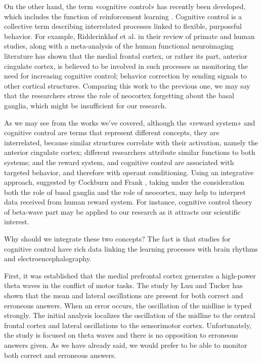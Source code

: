 \documentclass[14pt,a4paper]{scrartcl}
\begin{document}
On the other hand, the term «cognitive control» has recently been developed, which includes the function of reinforcement learning \cite{Cockburn2011}. Cognitive control is a collective term describing interrelated processes linked to flexible, purposeful behavior. For example, Ridderinkhof et al. \cite{Ridderinkhof2004} in their review of primate and human studies, along with a meta-analysis of the human functional neuroimaging literature has shown that the medial frontal cortex, or rather its part, anterior cingulate cortex, is believed to be involved in such processes as monitoring the need for increasing cognitive control; behavior correction by sending signals to other cortical structures. Comparing this work to the previous one, we may say that the researchers stress the role of neocortex forgetting about the basal ganglia, which might be insufficient for our research.

As we may see from the works we’ve covered, although the «reward system» and cognitive control are terms that represent different concepts, they are interrelated, because similar structures correlate with their activation, namely the anterior cingulate cortex; different researchers attribute similar functions to both systems; and the reward system, and cognitive control are associated with targeted behavior, and therefore with operant conditioning. Using an integrative approach, suggested by Cockburn and Frank \cite{Cockburn2011}, taking under the consideration both the role of basal ganglia and the role of neocortex, may help to interpret data received from human reward system. For instance, cognitive control theory of beta-wave part may be applied to our research as it attracts our scientific interest.

Why should we integrate these two concepts? The fact is that studies for cognitive control have rich data linking the learning processes with brain rhythms and electroencephalography.

First, it was established that the medial prefrontal cortex generates a high-power theta waves in the conflict of motor tasks. The study by Luu and Tucker \cite{Luu2001} has shown that the mean and lateral oscillations are present for both correct and erroneous answers. When an error occurs, the oscillation of the midline is typed strongly. The initial analysis localizes the oscillation of the midline to the central frontal cortex and lateral oscillations to the sensorimotor cortex. Unfortunately, the study is focused on theta waves and there is no opposition to erroneous answers given. As we have already said, we would prefer to be able to monitor both correct and erroneous answers.
\end{document}
